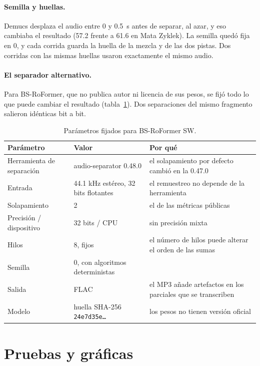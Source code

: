 \paragraph{Semilla y huellas.} Demucs desplaza el audio entre 0 y 0.5~s antes de separar, al azar, y eso cambiaba el
resultado (57.2 frente a 61.6 en Mata Zyklek). La semilla quedó fija en 0, y cada corrida guarda la huella de la mezcla y de
las dos pistas. Dos corridas con las mismas huellas usaron exactamente el mismo audio.

\paragraph{El separador alternativo.} Para BS-RoFormer, que no publica autor ni licencia de sus pesos, se fijó todo lo que
puede cambiar el resultado (tabla~\ref{tab:roformer}). Dos separaciones del mismo fragmento salieron idénticas bit a bit.

\begin{table}[ht]
  \centering\small
  \caption{Parámetros fijados para BS-RoFormer SW.}\label{tab:roformer}
  \begin{tabularx}{\textwidth}{@{}l l >{\raggedright\arraybackslash}X@{}}
    \toprule
    Parámetro & Valor & Por qué \\
    \midrule
    Herramienta de separación & audio-separator 0.48.0 & el solapamiento por defecto cambió en la 0.47.0 \\
    Entrada & 44.1 kHz estéreo, 32 bits flotantes & el remuestreo no depende de la herramienta \\
    Solapamiento & 2 & el de las métricas públicas \\
    Precisión / dispositivo & 32 bits / CPU & sin precisión mixta \\
    Hilos & 8, fijos & el número de hilos puede alterar el orden de las sumas \\
    Semilla & 0, con algoritmos deterministas & \\
    Salida & FLAC & el MP3 añade artefactos en los parciales que se transcriben \\
    Modelo & huella SHA-256 \texttt{24e7d35e\dots} & los pesos no tienen versión oficial \\
    \bottomrule
  \end{tabularx}
\end{table}

\section{Pruebas y gráficas}

